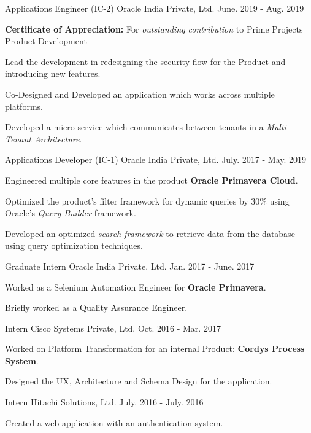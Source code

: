 \begin{cventries}
  \cventry
    {Applications Engineer (IC-2)}
    {Oracle India Private, Ltd.}
    {}
    {June. 2019 - Aug. 2019}
    {
      \begin{cvitems}
        \item {\textbf{Certificate of Appreciation:} For \textit{outstanding contribution} to Prime Projects Product Development}
        \item {Lead the development in redesigning the security flow for the Product and introducing new features.}
        \item {Co-Designed and Developed an application which works across multiple platforms.}
        \item {Developed a micro-service which communicates between tenants in a \textit{Multi-Tenant Architecture}.}
      \end{cvitems}
    }
  \cventry
    {Applications Developer (IC-1)}
    {Oracle India Private, Ltd.}
    {}
    {July. 2017 - May. 2019}
    {
      \begin{cvitems}
        \item {Engineered multiple core features in the product \textbf{Oracle Primavera Cloud}.}
        \item {Optimized the product's filter framework for dynamic queries by 30\% using Oracle's \textit{Query Builder} framework.}
        \item {Developed an optimized \textit{search framework} to retrieve data from the database using query optimization techniques.}
      \end{cvitems}
    }
  \cventry
    {Graduate Intern}
    {Oracle India Private, Ltd.}
    {}
    {Jan. 2017 - June. 2017}
    {
      \begin{cvitems}
        \item {Worked as a Selenium Automation Engineer for \textbf{Oracle Primavera}.}
        \item {Briefly worked as a Quality Assurance Engineer.}
      \end{cvitems}
    }
  \cventry
    {Intern}
    {Cisco Systems Private, Ltd.}
    {}
    {Oct. 2016 - Mar. 2017}
    {
      \begin{cvitems}
        \item {Worked on Platform Transformation for an internal Product: \textbf{Cordys Process System}.}
        \item {Designed the UX, Architecture and Schema Design for the application.}
      \end{cvitems} 
    }
  \cventry
    {Intern}
    {Hitachi Solutions, Ltd.}
    {}
    {July. 2016 - July. 2016}
    {
      \begin{cvitems}
        \item {Created a web application with an authentication system.}    
      \end{cvitems}
    }
\end{cventries}